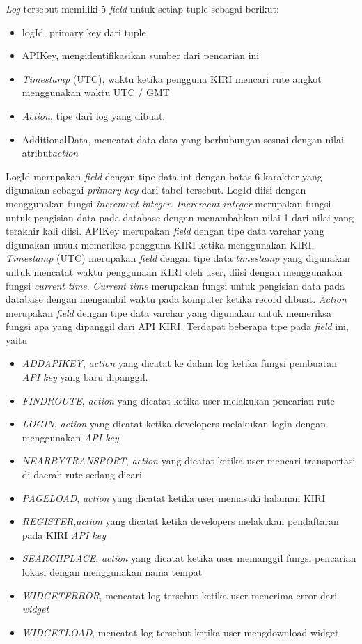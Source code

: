 \textsl{Log} tersebut memiliki 5 \textsl{field} untuk setiap tuple sebagai berikut:
\begin{itemize}
	\item logId, primary key dari tuple
	\item APIKey, mengidentifikasikan sumber dari pencarian ini
	\item \textsl{Timestamp} (UTC), waktu ketika pengguna KIRI mencari rute angkot menggunakan waktu UTC / GMT
	\item \textsl{Action}, tipe dari log yang dibuat.
	\item AdditionalData, mencatat data-data yang berhubungan sesuai dengan nilai atribut\textsl{action}
\end{itemize}

LogId merupakan \textsl{field} dengan tipe data int dengan batas 6 karakter yang digunakan sebagai \textsl{primary key} dari tabel tersebut. LogId diisi dengan menggunakan fungsi \textsl{increment integer}. \textsl{Increment integer} merupakan fungsi untuk pengisian data pada database dengan menambahkan nilai 1 dari nilai yang terakhir kali diisi.
APIKey merupakan \textsl{field} dengan tipe data varchar yang digunakan untuk memeriksa pengguna KIRI ketika menggunakan KIRI.
\textsl{Timestamp} (UTC) merupakan \textsl{field} dengan tipe data \textsl{timestamp} yang digunakan untuk mencatat waktu penggunaan KIRI oleh user, diisi dengan menggunakan fungsi \textsl{current time}. \textsl{Current time} merupakan fungsi untuk pengisian data pada database dengan mengambil waktu pada komputer ketika record dibuat.
\textsl{Action} merupakan \textsl{field} dengan tipe data varchar yang digunakan untuk memeriksa fungsi apa yang dipanggil dari API KIRI. Terdapat beberapa tipe pada \textsl{field} ini, yaitu
\begin{itemize}
	\item \textsl{ADDAPIKEY}, \textsl{action} yang dicatat ke dalam log ketika fungsi pembuatan \textsl{API key} yang baru dipanggil.
	\item \textsl{FINDROUTE}, \textsl{action} yang dicatat ketika user melakukan pencarian rute
	\item \textsl{LOGIN}, \textsl{action} yang dicatat ketika developers melakukan login dengan menggunakan \textsl{API key}
	\item \textsl{NEARBYTRANSPORT}, \textsl{action} yang dicatat ketika user mencari transportasi di daerah rute sedang dicari
	\item \textsl{PAGELOAD}, \textsl{action} yang dicatat ketika user memasuki halaman KIRI
 	\item \textsl{REGISTER},\textsl{action} yang dicatat ketika developers melakukan pendaftaran pada KIRI \textsl{API key}
	\item \textsl{SEARCHPLACE}, \textsl{action} yang dicatat ketika user memanggil fungsi pencarian lokasi dengan menggunakan nama tempat
	\item \textsl{WIDGETERROR}, mencatat log tersebut ketika user menerima error dari \textit{widget}
	\item \textsl{WIDGETLOAD}, mencatat log tersebut ketika user mengdownload widget
\end{itemize}
